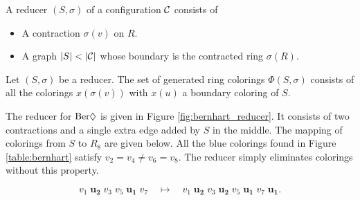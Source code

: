\begin{definition}
    A reducer $(S,\sigma)$ of a configuration $\mathcal{C}$ consists of
    \begin{itemize}
        \item A contraction $\sigma(v)$ on $R$.
        \item A graph $|S| < |\mathcal{C}|$ whose boundary is the contracted ring $\sigma(R)$.
    \end{itemize}
\end{definition}

\begin{definition}
    Let $(S, \sigma)$ be a reducer. The set of generated ring colorings $\Phi(S, \sigma)$ consists of all the colorings $x(\sigma(v))$ with $x(u)$ a boundary coloring of $S$.
\end{definition}


The reducer for $\text{Ber}\Diamond$ is given in Figure \ref{fig:bernhart_reducer}. It consists of two contractions and a single extra edge added by $S$ in the middle. The mapping of colorings from $S$ to $R_8$ are given below. All the blue colorings found in Figure \ref{table:bernhart} satisfy $v_2 =v_4 \neq v_6 = v_8$. The reducer simply eliminates colorings without this property.

\begin{equation}
    v_1\;\textbf{u}_\textbf{2}\;v_3\;v_5\;\textbf{u}_\textbf{1}\;v_7 \quad\mapsto \quad v_1\;\textbf{u}_\textbf{2}\;v_3\;\textbf{u}_\textbf{2}\;v_5\;\textbf{u}_\textbf{1}\;v_7\;\textbf{u}_\textbf{1}.
\end{equation}

